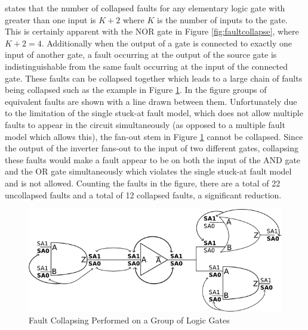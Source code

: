 \documentclass[12pt]{report}
\begin{document}
\cite{stroud} states that the number of collapsed faults for any elementary logic gate with greater than one input is $K+2$ where $K$ is the number of inputs to the gate.  This is certainly apparent with the NOR gate in Figure \ref{fig:faultcollapse}, where $K+2=4$.  Additionally when the output of a gate is connected to exactly one input of another gate, a fault occurring at the output of the source gate is indistinguishable from the same fault occurring at the input of the connected gate\cite{stroud}.  These faults can be collapsed together which leads to a large chain of faults being collapsed such as the example in Figure \ref{fig:collapsechain}\cite{stroud}.  In the figure groups of equivalent faults are shown with a line drawn between them.  Unfortunately due to the limitation of the single stuck-at fault model, which does not allow multiple faults to appear in the circuit simultaneously (as opposed to a multiple fault model which allows this), the fan-out stem in Figure \ref{fig:collapsechain} cannot be collapsed\cite{defectforcmos}.  Since the output of the inverter fans-out to the input of two different gates, collapsing these faults would make a fault appear to be on both the input of the AND gate and the OR gate simultaneously which violates the single stuck-at fault model and is not allowed\cite{defectforcmos}.  Counting the faults in the figure, there are a total of 22 uncollapsed faults and a total of 12 collapsed faults, a significant reduction.
\begin{figure}
	\begin{center}
		\includegraphics[scale=1]{images/faultchain-collapse}
	\end{center}
  \caption{Fault Collapsing Performed on a Group of Logic Gates}
  \label{fig:collapsechain}
\end{figure}
\end{document}
